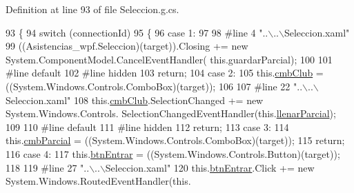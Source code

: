 Definition at line 93 of file Seleccion.\-g.\-cs.


\begin{DoxyCode}
93                                                                                                 \{
94             \textcolor{keywordflow}{switch} (connectionId)
95             \{
96             \textcolor{keywordflow}{case} 1:
97             
98 \textcolor{preprocessor}{            #line 4 "..\(\backslash\)..\(\backslash\)Seleccion.xaml"}
99 \textcolor{preprocessor}{}            ((Asistencias\_wpf.Seleccion)(target)).Closing += \textcolor{keyword}{new} System.ComponentModel.CancelEventHandler(\textcolor{keyword}{
      this}.guardarParcial);
100             
101 \textcolor{preprocessor}{            #line default}
102 \textcolor{preprocessor}{}\textcolor{preprocessor}{            #line hidden}
103 \textcolor{preprocessor}{}            \textcolor{keywordflow}{return};
104             \textcolor{keywordflow}{case} 2:
105             this.\hyperlink{class_asistencias__wpf_1_1_seleccion_adac0d1aa55be26c4cff9a610ee20b9c5}{cmbClub} = ((System.Windows.Controls.ComboBox)(target));
106             
107 \textcolor{preprocessor}{            #line 22 "..\(\backslash\)..\(\backslash\)Seleccion.xaml"}
108 \textcolor{preprocessor}{}            this.\hyperlink{class_asistencias__wpf_1_1_seleccion_adac0d1aa55be26c4cff9a610ee20b9c5}{cmbClub}.SelectionChanged += \textcolor{keyword}{new} System.Windows.Controls.
      SelectionChangedEventHandler(this.\hyperlink{class_asistencias__wpf_1_1_seleccion_a202ae9606e4234345de3f89402572d0b}{llenarParcial});
109             
110 \textcolor{preprocessor}{            #line default}
111 \textcolor{preprocessor}{}\textcolor{preprocessor}{            #line hidden}
112 \textcolor{preprocessor}{}            \textcolor{keywordflow}{return};
113             \textcolor{keywordflow}{case} 3:
114             this.\hyperlink{class_asistencias__wpf_1_1_seleccion_a24db3199864aca68b55959ae7477bb3b}{cmbParcial} = ((System.Windows.Controls.ComboBox)(target));
115             \textcolor{keywordflow}{return};
116             \textcolor{keywordflow}{case} 4:
117             this.\hyperlink{class_asistencias__wpf_1_1_seleccion_a7c5e0a561a721c40c2173b532d0995cf}{btnEntrar} = ((System.Windows.Controls.Button)(target));
118             
119 \textcolor{preprocessor}{            #line 27 "..\(\backslash\)..\(\backslash\)Seleccion.xaml"}
120 \textcolor{preprocessor}{}            this.\hyperlink{class_asistencias__wpf_1_1_seleccion_a7c5e0a561a721c40c2173b532d0995cf}{btnEntrar}.Click += \textcolor{keyword}{new} System.Windows.RoutedEventHandler(this.

\end{DoxyCode}
